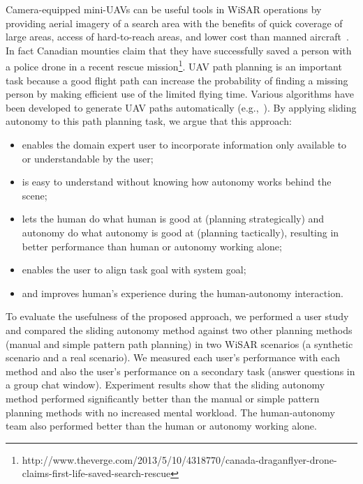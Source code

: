 \documentclass[journal]{IEEEtran}
\begin{document}
Camera-equipped mini-UAVs can be useful tools in WiSAR operations by providing aerial imagery of a search area with the benefits of quick coverage of large areas, access of hard-to-reach areas, and lower cost than manned aircraft~\cite{Murphy2008Cooperative, Goodrich2008Supporting}. In fact Canadian mounties claim that they have successfully saved a person with a police drone in a recent rescue mission\footnote{http://www.theverge.com/2013/5/10/4318770/canada-draganflyer-drone-claims-first-life-saved-search-rescue}. UAV path planning is an important task because a good flight path can increase the probability of finding a missing person by making efficient use of the limited flying time. Various algorithms have been developed to generate UAV paths automatically (e.g.,~\cite{Bourgault2003Coordinated, Lin2009UAV, Lin2014Hierarchical}). By applying sliding autonomy to this path planning task, we argue that this approach:
\begin{itemize}
\item enables the domain expert user to incorporate information only available to or understandable by the user;
\item is easy to understand without knowing how autonomy works behind the scene;
\item lets the human do what human is good at (planning strategically) and autonomy do what autonomy is good at (planning tactically), resulting in better performance than human or autonomy working alone;
\item enables the user to align task goal with system goal;
\item and improves human's experience during the human-autonomy interaction.
\end{itemize}

To evaluate the usefulness of the proposed approach, we performed a user study and compared the sliding autonomy method against two other planning methods (manual and simple pattern path planning) in two WiSAR scenarios (a synthetic scenario and a real scenario). We measured each user's performance with each method and also the user's performance on a secondary task (answer questions in a group chat window). Experiment results show that the sliding autonomy method performed significantly better than the manual or simple pattern planning methods with no increased mental workload. The human-autonomy team also performed better than the human or autonomy working alone.
\end{document}
